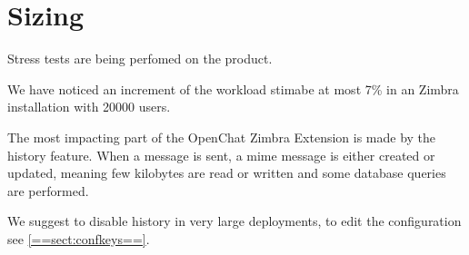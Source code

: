 \section{Sizing}
\label{==sect:sizing==}

Stress tests are being perfomed on the product.

We have noticed an increment of the workload stimabe at most 7\% in an Zimbra installation with 20000 users.

The most impacting part of the OpenChat Zimbra Extension is made by the history feature. When a message is sent, a mime
message is either created or updated, meaning few kilobytes are read or written and some database queries are performed.

\begin{comment}
TIP:
\end{comment}
\begin{info}
    We suggest to disable history in very large deployments, to edit the configuration see \ref{==sect:confkeys==}.
\end{info}
